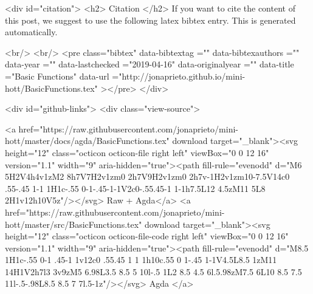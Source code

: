   
  <div id="citation">
  <h2> Citation </h2>
  If you want to cite the content of this post,
  we suggest to use the following latex bibtex entry.
  This is generated automatically.

  <br/>
  <br/>
  <pre class="bibtex"
       data-bibtextag =""
       data-bibtexauthors =""
       data-year =""
       data-lastchecked ="2019-04-16"
       data-originalyear =""
       data-title ="Basic Functions"
       data-url ="http://jonaprieto.github.io/mini-hott/BasicFunctions.tex"
  ></pre>
  </div>
  

  <div id="github-links">
    <div class="view-source">
      
        <a href="https://raw.githubusercontent.com/jonaprieto/mini-hott/master/docs/agda/BasicFunctions.tex" download target="_blank"><svg height="12" class="octicon octicon-file right left" viewBox="0 0 12 16" version="1.1" width="9" aria-hidden="true"><path fill-rule="evenodd" d="M6 5H2V4h4v1zM2 8h7V7H2v1zm0 2h7V9H2v1zm0 2h7v-1H2v1zm10-7.5V14c0 .55-.45 1-1 1H1c-.55 0-1-.45-1-1V2c0-.55.45-1 1-1h7.5L12 4.5zM11 5L8 2H1v12h10V5z"/></svg> Raw + Agda</a>
        <a href="https://raw.githubusercontent.com/jonaprieto/mini-hott/master/src/BasicFunctions.tex" download target="_blank"><svg height="12" class="octicon octicon-file-code right left" viewBox="0 0 12 16" version="1.1" width="9" aria-hidden="true"><path fill-rule="evenodd" d="M8.5 1H1c-.55 0-1 .45-1 1v12c0 .55.45 1 1 1h10c.55 0 1-.45 1-1V4.5L8.5 1zM11 14H1V2h7l3 3v9zM5 6.98L3.5 8.5 5 10l-.5 1L2 8.5 4.5 6l.5.98zM7.5 6L10 8.5 7.5 11l-.5-.98L8.5 8.5 7 7l.5-1z"/></svg> Agda </a>
      
